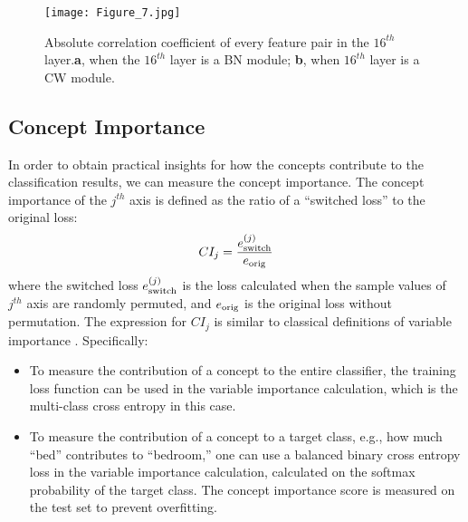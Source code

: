 \documentclass{article}
\begin{document}
\begin{figure}[ht]
    \centering
    \texttt{[image: Figure\_7.jpg]}
    \caption{Absolute correlation coefficient of every feature pair in the $16^{th}$ layer.\textbf{a}, when the $16^{th}$ layer is a BN module; \textbf{b}, when $16^{th}$ layer is a CW module. \label{fig:correlation}}
\end{figure}

\subsection{Concept Importance}
\label{sec:concept_importance}



In order to obtain practical insights for how the concepts contribute to the classification results, we can measure the concept importance. The concept importance of the $j^{th}$ axis is defined as the ratio of a ``switched loss'' to the original loss:
\begin{equation}
    CI_j = \frac{e^{(j)}_{\rm switch}}{e_{\rm orig}}
\end{equation}
where the switched loss $e^{(j)}_{\rm switch}$ is the loss calculated when the sample values of $j^{th}$ axis are randomly permuted, and $e_{\rm orig}$ is the original loss without permutation. The expression for $CI_j$ is similar to classical definitions of variable importance  \cite{breiman2001random,fisher2019all}. Specifically:
\begin{itemize}
\item To measure the contribution of a concept to the entire classifier, the training loss function can be used in the variable importance calculation, which is the multi-class cross entropy in this case. \item To measure the contribution of a concept to a target class, e.g., how much ``bed'' contributes to ``bedroom,'' one can use a balanced binary cross entropy loss in the variable importance calculation, calculated on the softmax probability of the target class. The concept importance score is measured on the test set to prevent overfitting.
\end{itemize}
\end{document}
